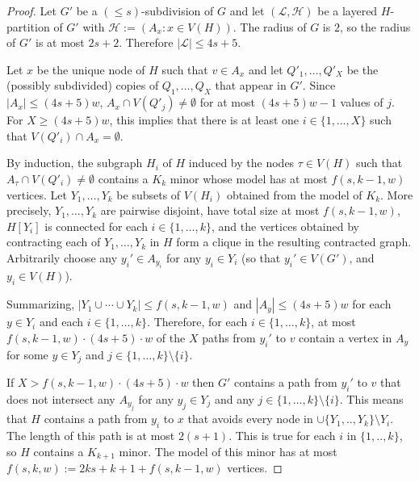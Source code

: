 \documentclass[kpfonts]{patmorin}
\begin{document}
\begin{proof}
  Let $G'$ be a $(\le\!\!s)$-subdivision of $G$ and let $(\mathcal{L},\mathcal{H})$ be a layered $H$-partition of $G'$ with $\mathcal{H}:=(A_x:x\in V(H))$.  The radius of $G$ is $2$, so the radius of $G'$ is at most $2s+2$.  Therefore $|\mathcal{L}|\le 4s+5$.

  Let $x$ be the unique node of $H$ such that $v\in A_x$ and let $Q'_1,\ldots,Q'_X$ be the (possibly subdivided) copies of $Q_1,\ldots,Q_X$ that appear in $G'$.  Since $|A_x| \le (4s+5)w$, $A_x \cap V(Q'_j)\neq\emptyset$ for at most $(4s+5)w-1$ values of $j$.  For $X \ge (4s+5)w$, this implies that there is at least one $i\in\{1,\ldots,X\}$ such that $V(Q'_i)\cap A_x=\emptyset$.

  By induction, the subgraph $H_i$ of $H$ induced by the nodes $\tau\in V(H)$ such that $A_{\tau}\cap V(Q'_i)\neq\emptyset$ contains a $K_k$ minor whose model has at most $f(s,k-1,w)$ vertices.  Let $Y_1,\ldots,Y_k$ be subsets of $V(H_i)$ obtained from the model of $K_k$.  More precisely, $Y_1,\ldots,Y_k$ are pairwise disjoint, have total size at most $f(s,k-1,w)$, $H[Y_i]$ is connected for each $i\in\{1,\ldots,k\}$, and the vertices obtained by contracting each of $Y_1,\ldots,Y_k$ in $H$ form a clique in the resulting contracted graph.  Arbitrarily choose any $y_i'\in A_{y_i}$ for any $y_i\in Y_i$ (so that $y_i'\in V(G')$, and $y_i\in V(H)$).

  Summarizing, $|Y_1\cup\cdots\cup Y_k|\le f(s,k-1,w)$ and $|A_y|\le (4s+5)w$ for each $y\in Y_i$ and each $i\in\{1,\ldots,k\}$.  Therefore, for each $i\in\{1,\ldots,k\}$, at most $f(s,k-1,w)\cdot(4s+5)\cdot w$ of the $X$ paths from $y_i'$ to $v$ contain a vertex in $A_y$ for some $y\in Y_j$ and $j\in\{1,\ldots,k\}\setminus \{i\}$.

  If $X > f(s,k-1,w)\cdot(4s+5)\cdot w$ then $G'$ contains a path from $y_i'$ to $v$ that does not intersect any $A_{y_j}$ for any $y_j\in Y_j$ and any $j\in\{1,\ldots,k\}\setminus\{i\}$.  This means that $H$ contains a path from $y_i$ to $x$ that avoids every node in $\cup\{Y_1,..,Y_k\}\setminus Y_i$.  The length of this path is at most $2(s+1)$. This is true for each $i$ in $\{1,..,k\}$, so $H$ contains a $K_{k+1}$ minor. The model of this minor has at most $f(s,k,w):=2ks+k+1+f(s,k-1,w)$ vertices.
\end{proof}
\end{document}
